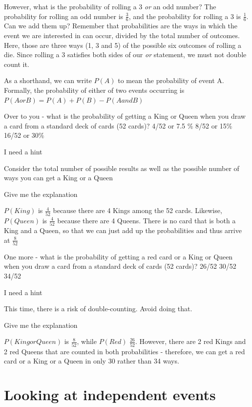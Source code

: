 \documentclass[
]{book}
\begin{document}
However, what is the probability of rolling a 3 \emph{or} an odd number? The probability for rolling an odd number is \(\frac{3}{6}\), and the probability for rolling a 3 is \(\frac{1}{6}\). Can we add them up? Remember that probabilities are the ways in which the event we are interested in can occur, divided by the total number of outcomes. Here, those are three ways (1, 3 and 5) of the possible six outcomes of rolling a die. Since rolling a 3 satisfies both sides of our \emph{or} statement, we must not double count it.

As a shorthand, we can write \(P(A)\) to mean the probability of event A. Formally, the probability of either of two events occurring is
\(P(A or B)=P(A)+P(B)-P(AandB)\)

Over to you - what is the probability of getting a King or Queen when you draw a card from a standard deck of cards (52 cards)? 4/52 or 7.5 \% 8/52 or 15\% 16/52 or 30\%

I need a hint

Consider the total number of possible results as well as the possible number of ways you can get a King or a Queen

Give me the explanation

\(P(King)\) is \(\frac{4}{52}\) because there are 4 Kings among the 52 cards. Likewise, \(P(Queen)\) is \(\frac{4}{52}\) because there are 4 Queens. There is no card that is both a King and a Queen, so that we can just add up the probabilities and thus arrive at \(\frac{8}{52}\)

One more - what is the probability of getting a red card or a King or Queen when you draw a card from a standard deck of cards (52 cards)? 26/52 30/52 34/52

I need a hint

This time, there is a risk of double-counting. Avoid doing that.

Give me the explanation

\(P(KingorQueen)\) is \(\frac{8}{52}\), while \(P(Red)\) \(\frac{26}{52}\). However, there are 2 red Kings and 2 red Queens that are counted in both probabilities - therefore, we can get a red card or a King or a Queen in only 30 rather than 34 ways.

\hypertarget{looking-at-independent-events}{%
\section{Looking at independent events}\label{looking-at-independent-events}}
\end{document}
